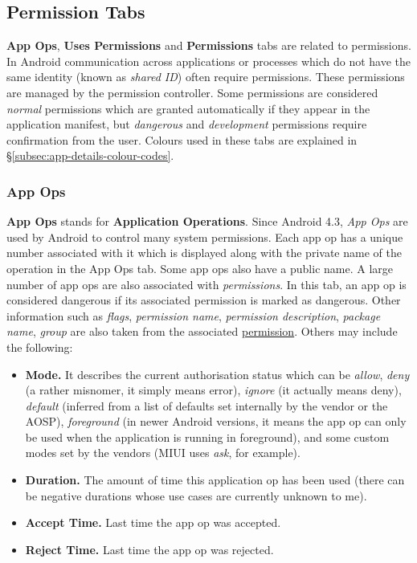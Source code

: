 \subsection{Permission Tabs}\label{subsec:permission-tabs} %
\textbf{App Ops}, \textbf{Uses Permissions} and \textbf{Permissions} tabs are related to permissions. In Android
communication across applications or processes which do not have the same identity (known as \textit{shared ID}) often
require permissions. These permissions are managed by the permission controller. Some permissions are considered
\textit{normal} permissions which are granted automatically if they appear in the application manifest, but
\textit{dangerous} and \textit{development} permissions require confirmation from the user. Colours used in these tabs
are explained in §\ref{subsec:app-details-colour-codes}.

\subsubsection{App Ops}\label{subsubsec:app-ops} %
\textbf{App Ops} stands for \textbf{Application Operations}. Since Android 4.3, \textit{App Ops} are used by Android to
control many system permissions. Each app op has a unique number associated with it which is displayed along with the
private name of the operation in the App Ops tab. Some app ops also have a public name. A large number of app ops are
also associated with \textit{permissions}. In this tab, an app op is considered dangerous if its associated permission
is marked as dangerous. Other information such as \textit{flags}, \textit{permission name}, \textit{permission description},
\textit{package name}, \textit{group} are also taken from the associated \hyperref[subsubsec:permissions]{permission}.
Others may include the following:
\begin{itemize}
    \item \textbf{Mode.} It describes the current authorisation status which can be \textit{allow}, \textit{deny} (a
    rather misnomer, it simply means error), \textit{ignore} (it actually means deny), \textit{default} (inferred from
    a list of defaults set internally by the vendor or the AOSP), \textit{foreground} (in newer Android versions, it
    means the app op can only be used when the application is running in foreground), and some custom modes set by the
    vendors (MIUI uses \textit{ask}, for example).

    \item \textbf{Duration.} The amount of time this application op has been used (there can be negative durations whose
    use cases are currently unknown to me).

    \item \textbf{Accept Time.} Last time the app op was accepted.

    \item \textbf{Reject Time.} Last time the app op was rejected.
\end{itemize}

